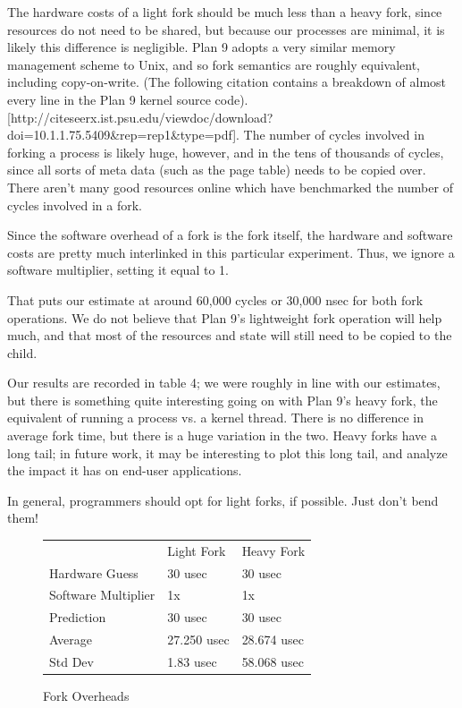 \documentclass[letterpaper,twocolumn,10pt]{article}
\begin{document}
The hardware costs of a light fork should be much less than a heavy fork, since
resources do not need to be shared, but because our processes are minimal, it
is likely this difference is negligible. Plan 9 adopts a very similar memory management
scheme to Unix, and so fork semantics are roughly equivalent, including copy-on-write. (The 
following citation contains a breakdown of almost every line in the Plan 9 kernel source code).
[http://citeseerx.ist.psu.edu/viewdoc/download?doi=10.1.1.75.5409&rep=rep1&type=pdf]. The number
of cycles involved in forking a process is likely huge, however, and in the tens of thousands of 
cycles, since all sorts of meta data (such as the page table) needs to be copied over. There 
aren't many good resources online which have benchmarked the number of cycles involved in a fork.

Since the software overhead of a fork is the fork itself, the hardware and software costs are 
pretty much interlinked in this particular experiment. Thus, we ignore a software multiplier, setting it
equal to 1. 

That puts our estimate at around 60,000 cycles or 30,000 nsec for both fork operations. We do not 
believe that Plan 9's lightweight fork operation will help much, and that most of the resources 
and state will still need to be copied to the child.

Our results are recorded in table 4; we were roughly in line with our estimates, but there is something quite interesting going on with Plan 9's heavy fork, the equivalent of running a process vs. a kernel thread. There is no difference in average fork time, but there is a huge variation in the two. Heavy forks have a long tail; in future work, it may be interesting to plot this long tail, and analyze the impact it has on end-user applications.

In general, programmers should opt for light forks, if possible. Just don't bend them!

\begin{figure}
	\centering
\begin{tabular}{lll}
        & Light Fork & Heavy Fork \\
Hardware Guess & 30 usec & 30 usec \\
Software Multiplier & 1x & 1x \\
Prediction & 30 usec & 30 usec \\
Average & 27.250  usec & 28.674  usec \\
Std Dev & 1.83 usec & 58.068 usec                  
\end{tabular}
\caption{Fork Overheads}
\label{tab:forkoverheads}
\end{figure}
\end{document}
